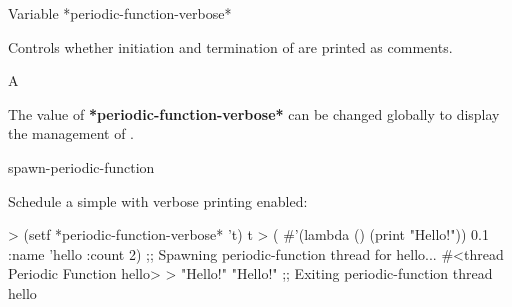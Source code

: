 \begin{functiondoc}{Variable}%
  {*periodic-function-verbose*}{}%

\fnsyntax

\fnpurpose Controls whether initiation and termination of
  are printed as comments.

\fnpackage {}

\fnmodule {}

\fnvaluetype A 

\fninitialvalue \nil

\fndescription The value of \textbf{*periodic-function-verbose*} can be
changed globally to display the management of .

\begin{alsos}{spawn-periodic-function}
\end{alsos}

%
\fnexample 
Schedule a simple  with verbose printing enabled:
\begin{example}
> (setf *periodic-function-verbose* 't)
t
> ( #'(lambda () (print "Hello!")) 0.1 
    :name 'hello
    :count 2)
;; Spawning periodic-function thread for hello...
#<thread Periodic Function hello>
>
"Hello!" 
"Hello!" 
;; Exiting periodic-function thread hello
\end{example}

\end{functiondoc}


